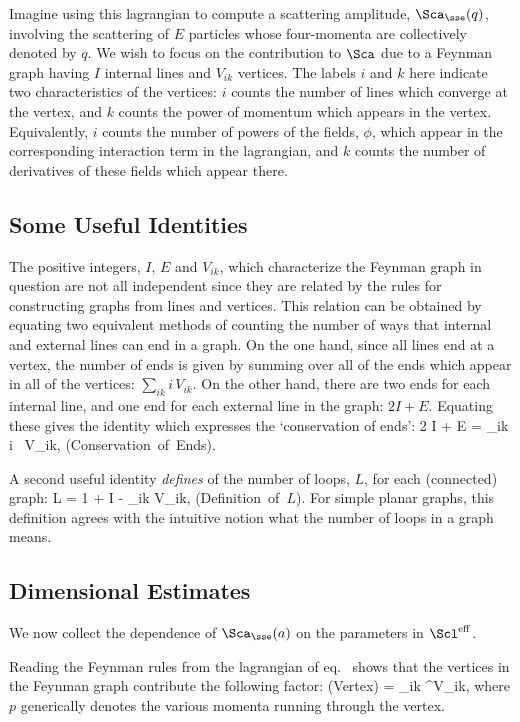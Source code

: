 \documentclass[12pt]{report}
\def\leff{\Scl^{\rm eff}}
\begin{document}
Imagine using this lagrangian to compute a scattering
amplitude, 
$\Sca_\sse(q)$, involving the scattering of $E$ particles
whose four-momenta are collectively denoted by $q$. We wish
to focus on the contribution to $\Sca$ due to a Feynman
graph having $I$ internal lines and $V_{ik}$ vertices. The
labels $i$ and $k$ here indicate two characteristics of the
vertices: $i$ counts the number of lines which converge at
the vertex, and $k$ counts the power of momentum which
appears in the vertex. Equivalently, $i$ counts the number
of powers of the fields, $\phi$, which appear in the
corresponding interaction term in the lagrangian, and $k$
counts the number of derivatives of these fields which
appear there.

\subsection{Some Useful Identities}

The positive integers, $I$, $E$ and $V_{ik}$, which
characterize the Feynman graph in question are not all
independent since they are related by the rules for
constructing graphs from lines and vertices. This relation
can be obtained by equating two equivalent methods of
counting the number of ways that internal and external
lines can end in a graph. On the one hand, since all lines
end at a vertex, the number of ends is given by summing
over all of the ends which appear in all of the vertices:
$\sum_{ik} i 
\, V_{ik}$. On the other hand, there are two ends for each
internal line, and one end for each external line in the
graph: $2 I + E$. Equating these gives the identity which
expresses the `conservation of ends':
%
\eq
\label{consofends}
2 I + E = \sum_{ik} i \,  V_{ik}, \qquad
\hbox{(Conservation of Ends)}.
\eeq

A second useful identity {\em defines} of the number of
loops, $L$, for each (connected) graph:
%
\eq
\label{loopdef}
L = 1 + I - \sum_{ik} V_{ik}, 
\qquad \hbox{(Definition of $L$)}.
\eeq
%
For simple planar graphs, this definition agrees with the
intuitive notion what the number of loops in a graph means.

\subsection{Dimensional Estimates}

We now collect the dependence of $\Sca_\sse(a)$ on the 
parameters in $\leff$.

Reading the Feynman rules from the lagrangian of
eq.~ shows that the vertices in the Feynman
graph contribute the following factor:
%
\eq
\label{vertexcont}
\hbox{(Vertex)} =  \prod_{ik} ^{V_{ik}},
\eeq
%
where $p$ generically denotes the various momenta running
through the vertex.
\end{document}
